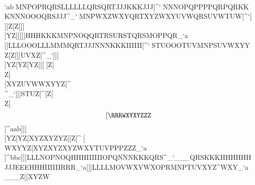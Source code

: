                            \\\QRTOPRNOPOPRMMMRSTWXYXYZYYZWXY`ab                                                            ^^^MNPOPRQRSLLLLLLQRSQRTJJJKKKJJJ]^`                                                            ^^^NNNOPQPPPPQRPQRKKKNNNOOOQRSJJJ^_`                                                            ^^^MNPWXZWXYQRTXYZWXYUVWQRSUVWTUW]^`                                                            ]]]Z[\XYZYZ[YZ[XYZXXX\]][\][\][\]``a                                                            ^^^\\]Z[]]\\]YZ[[[\YZ[XYZ[[\\\]WXYOOO[\]^_`                                                            ]]]HHHKKKMNPNOQQRTRSURSTQRSMOPPQR_`a                                                            \\\OPQNOQPQROPQQRTTUVYZ[WXYXYYYZ[`ab                                                            ]]]LLLOOOLLLMMMQRTJJJNNNKKKIIIIII]^`                                                            ^^^STUOOOTUVMNPSUVWXYYZ[Z[\Z[\RST_`a                                                            ]]]UVXZ[\QRSLLLQRTSTVNNNLLLQSTTUW^_`                                                            ]]]\\]YZ[YZ[YZ[[[\XXXYZ[WXY[\][\]``a                                                            ___]^^Z[\ZZ[YZ[YZ[YZ[ZZ\WXYXYZWXY\]^                                                            ^^^\\]Z[\[\]Z[\[\][\]XYZUVWWXYYZ[\]^                                                            \\\OPQOPRUVXOPRQRSQRTVWXUVWRSUMNP^_`                                                            ]]]STUZ[\VWXUVWWXYSTU\]^[Z[\\\]Z[\[[\RRRWXYXYZZZ\]]^aab                                                            ]]]\\]YZ[YZ[XYZXYZYZ[[\]Z[\Z[\Z[\\]^                                                            ^^^[\\WXYYZ[XYZXYZXYZWXYTUVPPPZZZ_`a                                                            \\\PQSKMNHHHGGGGGGZ[\STUNOPNNNQRS_`a                                                            ^^^STVWXZPQRVWXTUVOPRZ[\XYZYZ[]]^bbc                                                            ]]]LLLNOPNOQHHHIIIIIIOPQNNNKKKQRS^_`                                                            ___QRSKKKHHHHHHJJJEEEHHHIIIIIIRRR_`a                                                            ]]]LLLLMOVWXVWXOPRMNPTUVXYZ\]^WXY_`a                                                            ___Z[\YZ[XYZW